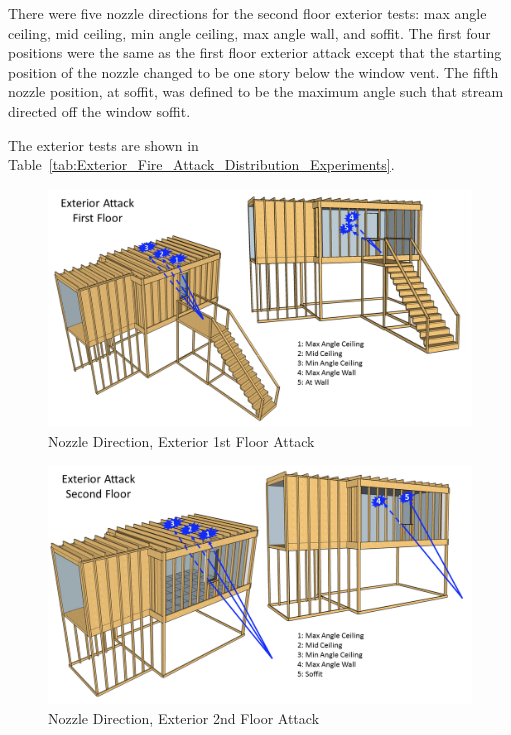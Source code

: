 \documentclass{book}
\begin{document}
There were five nozzle directions for the second floor exterior tests: max angle ceiling, mid ceiling, min angle ceiling, max angle wall, and soffit. The first four positions were the same as the first floor exterior attack except that the starting position of the nozzle changed to be one story below the window vent. The fifth nozzle position, at soffit, was defined to be the maximum angle such that stream directed off the window soffit.

The exterior tests are shown in Table~\ref{tab:Exterior_Fire_Attack_Distribution_Experiments}.

\begin{figure}[!ht]
	\centering
	\includegraphics[width=\columnwidth]{Figures/Water_Distribution/Nozzle_Position_ExtFirstfloor}
	\caption{Nozzle Direction, Exterior 1st Floor Attack}
	\label{fig:Nozzle_Direction_Exterior_1st_Floor_Attack}
\end{figure}

\begin{figure}[!ht]
	\centering
	\includegraphics[width=\columnwidth]{Figures/Water_Distribution/Nozzle_Position_ExtSecondfloor}
	\caption{Nozzle Direction, Exterior 2nd Floor Attack}
	\label{fig:Nozzle_Direction_Exterior_2nd_Floor_Attack}
\end{figure}
\end{document}
